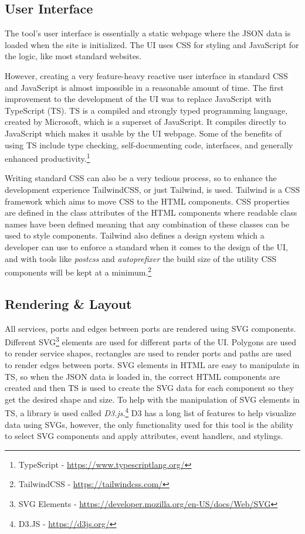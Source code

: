 \subsection{User Interface}
The tool's user interface is essentially a static webpage where the JSON data is loaded when the site is initialized.
The UI uses CSS for styling and JavaScript for the logic, like most standard websites.

However, creating a very feature-heavy reactive user interface in standard CSS and JavaScript is almost impossible in a reasonable amount of time.
The first improvement to the development of the UI was to replace JavaScript with TypeScript (TS).
TS is a compiled and strongly typed programming language, created by Microsoft, which is a superset of JavaScript. It compiles directly to JavaScript which makes it usable by the UI webpage.
Some of the benefits of using TS include type checking, self-documenting code, interfaces, and generally enhanced productivity.\footnote{TypeScript - \url{https://www.typescriptlang.org/}}

Writing standard CSS can also be a very tedious process, so to enhance the development experience TailwindCSS, or just Tailwind, is used.
Tailwind is a CSS framework which aims to move CSS to the HTML components. CSS properties are defined in the class attributes of the HTML components where readable class names have been defined meaning that any combination of these classes can be used to style components.
Tailwind also defines a design system which a developer can use to enforce a standard when it comes to the design of the UI, and with tools like \textit{postcss} and \textit{autoprefixer} the build size of the utility CSS components will be kept at a minimum.\footnote{TailwindCSS - \url{https://tailwindcss.com/}}

\subsection{Rendering \& Layout}
All services, ports and edges between ports are rendered using SVG components.
Different SVG\footnote{SVG Elements - \url{https://developer.mozilla.org/en-US/docs/Web/SVG}} elements are used for different parts of the UI. Polygons are used to render service shapes, rectangles are used to render ports and paths are used to render edges between ports.
SVG elements in HTML are easy to manipulate in TS, so when the JSON data is loaded in, the correct HTML components are created and then TS is used to create the SVG data for each component so they get the desired shape and size.
To help with the manipulation of SVG elements in TS, a library is used called \textit{D3.js}.\footnote{D3.JS - \url{https://d3js.org/}} D3 has a long list of features to help visualize data using SVGs, however, the only functionality used for this tool is
the ability to select SVG components and apply attributes, event handlers, and stylings.

